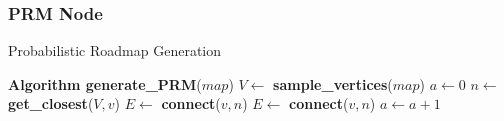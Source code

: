 \documentclass[conference]{IEEEtran}
\begin{document}
\subsubsection{PRM Node}
\begin{algorithm}
  \caption{Probabilistic Roadmap Generation}
  \label{alg:prm}
  \begin{algorithmic}[1]
    \State \textbf{Algorithm generate\_PRM}\textnormal{($map$)}
    \State $V \leftarrow $\textbf{ sample\_vertices}\textnormal{($map$)}
    \State $a \leftarrow 0$
    \State $n \leftarrow$\textbf{ get\_closest}\textnormal{($V, v$)}
    \State $E \leftarrow$\textbf{ connect}\textnormal{($v, n$)}
    \EndIf
    \State $E \leftarrow$\textbf{ connect}\textnormal{($v, n$)}
    \EndIf
    \State $a \leftarrow a + 1$
    \EndWhile
    \EndFor
  \end{algorithmic}
\end{algorithm}
\end{document}
